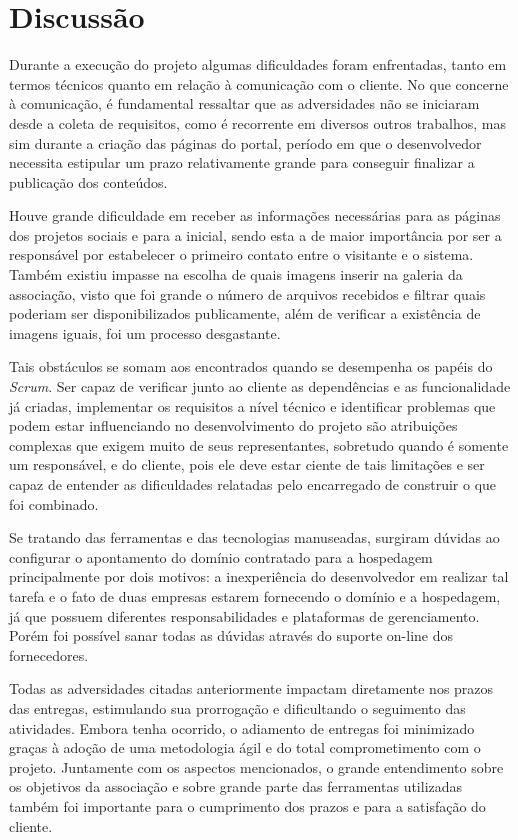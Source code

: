 \hspace{2.5cm}
\section{Discussão}
\hspace{2.5cm}

Durante a execução do projeto algumas dificuldades foram enfrentadas, tanto em termos técnicos quanto em relação à comunicação com o cliente. No que concerne à comunicação, é fundamental ressaltar que as adversidades não se iniciaram desde a coleta de requisitos, como é recorrente em diversos outros trabalhos, mas sim durante a criação das páginas do portal, período em que o desenvolvedor necessita estipular um prazo relativamente grande para conseguir finalizar a publicação dos conteúdos.

Houve grande dificuldade em receber as informações necessárias para as páginas dos projetos sociais e para a inicial, sendo esta a de maior importância por ser a responsável por estabelecer o primeiro contato entre o visitante e o sistema. Também existiu impasse na escolha de quais imagens inserir na galeria da associação, visto que foi grande o número de arquivos recebidos e filtrar quais poderiam ser disponibilizados publicamente, além de verificar a existência de imagens iguais, foi um processo desgastante.

Tais obstáculos se somam aos encontrados quando se desempenha os papéis do \textit{Scrum}. Ser capaz de verificar junto ao cliente as dependências e as funcionalidade já criadas, implementar os requisitos a nível técnico e identificar problemas que podem estar influenciando no desenvolvimento do projeto são atribuições complexas que exigem muito de seus representantes, sobretudo quando é somente um responsável, e do cliente, pois ele deve estar ciente de tais limitações e ser capaz de entender as dificuldades relatadas pelo encarregado de construir o que foi combinado.

Se tratando das ferramentas e das tecnologias manuseadas, surgiram dúvidas ao configurar o apontamento do domínio contratado para a hospedagem principalmente por dois motivos: a inexperiência do desenvolvedor em realizar tal tarefa e o fato de duas empresas estarem fornecendo o domínio e a hospedagem, já que possuem diferentes responsabilidades e plataformas de gerenciamento. Porém foi possível sanar todas as dúvidas através do suporte on-line dos fornecedores.

Todas as adversidades citadas anteriormente impactam diretamente nos prazos das entregas, estimulando sua prorrogação e dificultando o seguimento das atividades. Embora tenha ocorrido, o adiamento de entregas foi minimizado graças à adoção de uma metodologia ágil e do total comprometimento com o projeto. Juntamente com os aspectos mencionados, o grande entendimento sobre os objetivos da associação e sobre grande parte das ferramentas utilizadas também foi importante para o cumprimento dos prazos e para a satisfação do cliente.


